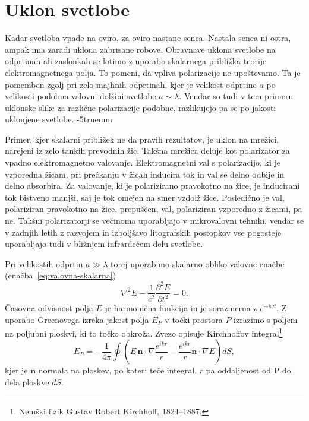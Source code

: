 \section{Uklon svetlobe}
Kadar svetloba vpade na oviro, za oviro nastane senca. Nastala senca ni ostra, ampak
ima zaradi uklona zabrisane robove. Obravnave 
uklona svetlobe na odprtinah ali zaslonkah se lotimo z uporabo
skalarnega približka teorije elektromagnetnega polja. To pomeni, da vpliva 
polarizacije ne upoštevamo. Ta je pomemben zgolj pri zelo majhnih odprtinah, 
kjer je velikost odprtine $a$ po velikosti podobna valovni dolžini svetlobe $a \sim \lambda$. 
Vendar so tudi v tem primeru uklonske slike za različne polarizacije podobne, 
razlikujejo pa se po jakosti uklonjene svetlobe.
\vglue-5truemm
\begin{remark}
Primer, kjer skalarni približek ne da pravih rezultatov, je uklon na mrežici, narejeni 
iz zelo tankih prevodnih žic. Takšna mrežica deluje kot polarizator za vpadno elektromagnetno valovanje.
Elektromagnetni val s polarizacijo, ki je vzporedna žicam, pri prečkanju v žicah inducira tok
in val se delno odbije in delno absorbira. Za valovanje, ki je polarizirano pravokotno 
na žice, je  inducirani tok bistveno manjši, saj je tok omejen na smer
vzdolž žice. Posledično je val, polariziran pravokotno na žice, prepuščen, 
val, polariziran vzporedno z žicami, pa ne. 
Takšni polarizatorji se večinoma uporabljajo v mikrovalovni tehniki, 
vendar se v zadnjih letih z razvojem in izboljšavo litografskih postopkov
vse pogosteje uporabljajo tudi v bližnjem infrardečem delu svetlobe.
\end{remark}

Pri velikostih odprtin $a\gg\lambda$ torej uporabimo skalarno obliko valovne enačbe 
(enačba~\ref{eq:valovna-skalarna})
\begin{equation}
\nabla^2 E - \frac{1}{c^2}\frac{\partial^2 E}{\partial t^2} = 0.
\label{eq:skalarna-valovna-enačba}
\end{equation}
Časovna odvisnost polja $E$ je harmonična funkcija in 
je sorazmerna z $e^{-i \omega t}$. Z uporabo Greenovega izreka 
jakost polja $E_P$ v točki prostora $P$ izrazimo s poljem na 
poljubni ploskvi, ki to točko obkroža. 
Zvezo opisuje Kirchhoffov integral\footnote{Nemški fizik Gustav Robert Kirchhoff, 1824--1887.} 
\begin{equation}
E_P = -\frac{1}{4\pi}\oint \left(E\,\mathbf{n}\cdot \nabla \frac{e^{ikr}}{r}-
\frac{e^{ikr}}{r}\mathbf{n}\cdot \nabla E \right) dS,
\label{eq:Kirchhoffov-integral}
\end{equation}
kjer je $\mathbf{n}$ normala na ploskev, po kateri teče integral, $r$ pa oddaljenost od P
do dela ploskve $dS$. 

